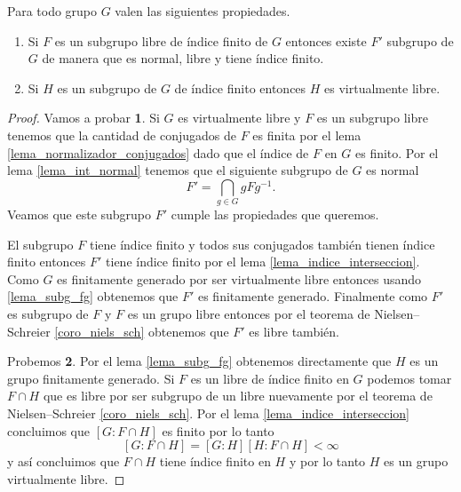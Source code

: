 \documentclass[tesis.tex]{subfiles}
\begin{document}
\begin{prop}\label{prop_vls}
	Para todo grupo $G$ \vl valen las siguientes propiedades.
	\begin{enumerate}
		\item Si $F$ es un subgrupo libre de índice finito de $G$ entonces existe $F'$ subgrupo de $G$ de manera que es normal, libre y tiene índice finito.
		\item Si $H$ es un subgrupo de $G$ de índice finito entonces $H$ es virtualmente libre.
	\end{enumerate}
\end{prop}

\begin{proof}
	Vamos a probar \textbf{1}.
	Si $G$ es virtualmente libre y $F$ es un subgrupo libre tenemos que la cantidad de conjugados de $F$ es finita por el lema \ref{lema_normalizador_conjugados} dado que el índice de $F$ en $G$ es finito.
	Por el lema \ref{lema_int_normal} tenemos que el siguiente subgrupo de $G$ es normal
	\[
	F' = \bigcap_{g \in G} gFg^{-1}.
	\]
	Veamos que este subgrupo $F'$ cumple las propiedades que queremos. 
	
	
	El subgrupo $F$ tiene índice finito y todos sus conjugados también tienen índice finito entonces $F'$ tiene índice finito por el lema \ref{lema_indice_interseccion}.
	Como $G$ es finitamente generado por ser virtualmente libre entonces usando \ref{lema_subg_fg} obtenemos que $F'$ es finitamente generado.
	Finalmente como $F'$ es subgrupo de $F$ y $F$ es un grupo libre entonces por el teorema de Nielsen--Schreier \ref{coro_niels_sch} obtenemos que $F'$ es libre también.
	
	
	Probemos \textbf{2}. 
	Por el lema \ref{lema_subg_fg} obtenemos directamente que $H$ es un grupo finitamente generado.
	Si $F$ es un libre de índice finito en $G$ podemos tomar $F \cap H$ que es libre por ser subgrupo de un libre nuevamente por el teorema de Nielsen--Schreier \ref{coro_niels_sch}.
	Por el lema \ref{lema_indice_interseccion} concluimos que $[G:F \cap H]$ es finito por lo tanto 
	\[
		[G:F \cap H] = [G : H][H : F \cap H] < \infty	
	\]
	y así concluimos que $F \cap H$ tiene índice finito en $H$ y por lo tanto $H$ es un grupo virtualmente libre.
	
\end{proof}
\end{document}
